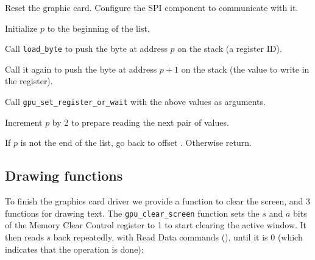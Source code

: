 \begin{paracol}{2}

Reset the graphic card. Configure the SPI component to communicate with it.


Initialize $p$ to the beginning of the list.


Call \verb!load_byte! to push the byte at address $p$ on the stack (a register
ID).


Call it again to push the byte at address $p+1$ on the stack (the value to
write in the register).


Call \verb!gpu_set_register_or_wait! with the above values as arguments.


Increment $p$ by 2 to prepare reading the next pair of values.


If $p$ is not the end of the list, go back to offset
. Otherwise return.

\end{paracol}

\subsection{Drawing functions}

To finish the graphics card driver we provide a function to clear the screen,
and 3 functions for drawing text. The \verb!gpu_clear_screen! function sets the
$s$ and $a$ bits of the Memory Clear Control register to 1 to start clearing
the active window. It then reads $s$ back repeatedly, with Read Data commands
(), until it is 0 (which indicates that the operation is done):

\begin{TwoColumns}
\\
\end{TwoColumns}

